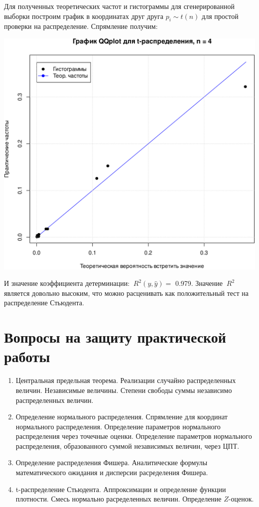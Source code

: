 \documentclass[
]{article}
\begin{document}
Для полученных теоретических частот и гистограммы для сгенерированной
выборки построим график в координатах друг друга \(p_i \sim t(n)\) для
простой проверки на распределение. Спрямление получим:

\begin{center}\includegraphics[width=0.6\linewidth]{Prac4_files/figure-latex/unnamed-chunk-11-1} \end{center}

И значение коэффициента детерминации: \(\ R^2(y, \hat{y}) =\) 0.979.
Значение \(\ R^2\ \) является довольно высоким, что можно расценивать
как положительный тест на распределение Стьюдента.

\hypertarget{ux432ux43eux43fux440ux43eux441ux44b-ux43dux430-ux437ux430ux449ux438ux442ux443-ux43fux440ux430ux43aux442ux438ux447ux435ux441ux43aux43eux439-ux440ux430ux431ux43eux442ux44b}{%
\section{\texorpdfstring{\textbf{Вопросы на защиту практической
работы}}{Вопросы на защиту практической работы}}\label{ux432ux43eux43fux440ux43eux441ux44b-ux43dux430-ux437ux430ux449ux438ux442ux443-ux43fux440ux430ux43aux442ux438ux447ux435ux441ux43aux43eux439-ux440ux430ux431ux43eux442ux44b}}

\begin{enumerate}
\def\labelenumi{\arabic{enumi}.}
\item
  Центральная предельная теорема. Реализации случайно распределенных
  величин. Независимые величины. Степени свободы суммы независимо
  распределенных величин.
\item
  Определение нормального распределения. Спрямление для координат
  нормального распределения. Определение параметров нормального
  распределения через точечные оценки. Определение параметров
  нормального распределения, образованного суммой независимых величин,
  через ЦПТ.
\item
  Определение распределения Фишера. Аналитические формулы
  математического ожидания и дисперсии расределения Фишера.
\item
  t-распределение Стьюдента. Аппроксимации и определение функции
  плотности. Смесь нормально расределенных величин. Определение
  \(Z\)-оценок.
\end{enumerate}
\end{document}

